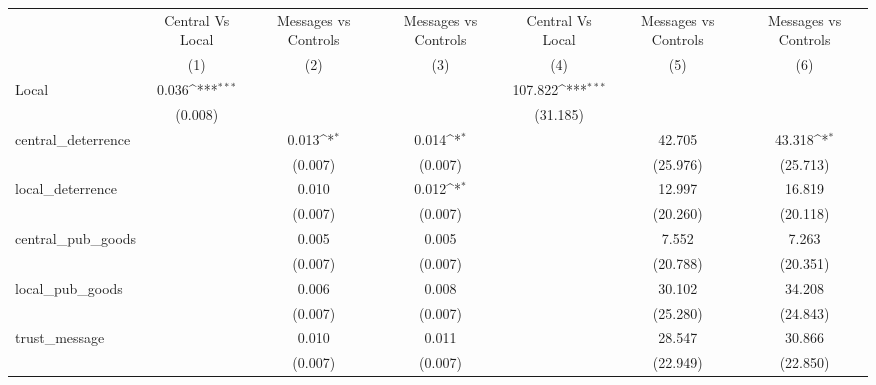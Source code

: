 {
\def\sym#1{\ifmmode^{#1}\else\(^{#1}\)\fi}
\begin{tabular}{l*{6}{c}}
\hline\hline
                &\multicolumn{1}{c}{Central Vs Local}&\multicolumn{1}{c}{Messages vs Controls}&\multicolumn{1}{c}{Messages vs Controls}&\multicolumn{1}{c}{Central Vs Local}&\multicolumn{1}{c}{Messages vs Controls}&\multicolumn{1}{c}{Messages vs Controls}\\
                &\multicolumn{1}{c}{(1)}         &\multicolumn{1}{c}{(2)}         &\multicolumn{1}{c}{(3)}         &\multicolumn{1}{c}{(4)}         &\multicolumn{1}{c}{(5)}         &\multicolumn{1}{c}{(6)}         \\
\hline
Local           &    0.036\sym{***}&                  &                  &  107.822\sym{***}&                  &                  \\
                &  (0.008)         &                  &                  & (31.185)         &                  &                  \\
central\_deterrence&                  &    0.013\sym{*}  &    0.014\sym{*}  &                  &   42.705         &   43.318\sym{*}  \\
                &                  &  (0.007)         &  (0.007)         &                  & (25.976)         & (25.713)         \\
local\_deterrence&                  &    0.010         &    0.012\sym{*}  &                  &   12.997         &   16.819         \\
                &                  &  (0.007)         &  (0.007)         &                  & (20.260)         & (20.118)         \\
central\_pub\_goods&                  &    0.005         &    0.005         &                  &    7.552         &    7.263         \\
                &                  &  (0.007)         &  (0.007)         &                  & (20.788)         & (20.351)         \\
local\_pub\_goods &                  &    0.006         &    0.008         &                  &   30.102         &   34.208         \\
                &                  &  (0.007)         &  (0.007)         &                  & (25.280)         & (24.843)         \\
trust\_message   &                  &    0.010         &    0.011         &                  &   28.547         &   30.866         \\
                &                  &  (0.007)         &  (0.007)         &                  & (22.949)         & (22.850)         \\

\end{tabular}}
